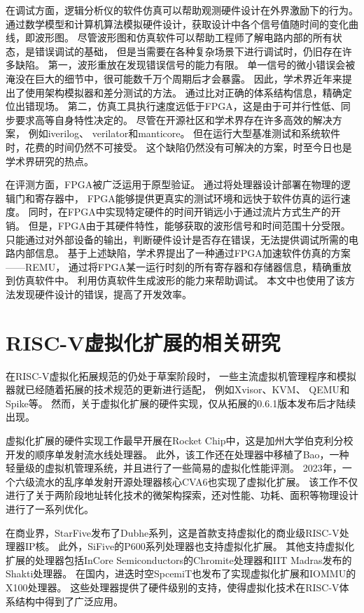 在调试方面，逻辑分析仪的软件仿真可以帮助观测硬件设计在外界激励下的行为。
通过数学模型和计算机算法模拟硬件设计，获取设计中各个信号值随时间的变化曲线，即波形图。
尽管波形图和仿真软件可以帮助工程师了解电路内部的所有状态，是错误调试的基础，
但是当需要在各种复杂场景下进行调试时，仍旧存在许多缺陷。
第一，波形重放在发现错误信号的能力有限。
单一信号的微小错误会被淹没在巨大的细节中，很可能数千万个周期后才会暴露。
因此，学术界近年来提出了使用架构模拟器和差分测试的方法。
通过比对正确的体系结构信息，精确定位出错现场。
第二，仿真工具执行速度远低于FPGA，这是由于可并行性低、同步要求高等自身特性决定的。
尽管在开源社区和学术界存在许多高效的解决方案，
例如iverilog\cite{github:iverilog}、
verilator\cite{github:verilator}和manticore\cite{asplso23manticore}。
但在运行大型基准测试和系统软件时，花费的时间仍然不可接受。
这个缺陷仍然没有可解决的方案，时至今日也是学术界研究的热点。

在评测方面，FPGA被广泛运用于原型验证。
通过将处理器设计部署在物理的逻辑门和寄存器中，
FPGA能够提供更真实的测试环境和远快于软件仿真的运行速度。
同时，在FPGA中实现特定硬件的时间开销远小于通过流片方式生产的开销。
但是，FPGA由于其硬件特性，能够获取的波形信号和时间范围十分受限。
只能通过对外部设备的输出，判断硬件设计是否存在错误，无法提供调试所需的电路内部信息。
基于上述缺陷，学术界提出了一种通过FPGA加速软件仿真的方案——REMU\cite{iccd2023remu}，
通过将FPGA某一运行时刻的所有寄存器和存储器信息，精确重放到仿真软件中。
利用仿真软件生成波形的能力来帮助调试。
本文中也使用了该方法发现硬件设计的错误，提高了开发效率。

\section{RISC-V虚拟化扩展的相关研究}
在RISC-V虚拟化拓展规范的仍处于草案阶段时，
一些主流虚拟机管理程序和模拟器就已经随着拓展的技术规范的更新进行适配，
例如Xvisor\cite{pdp2015xvisor}、KVM\cite{kvm:H-ext}、
QEMU\cite{qemu-riscv:H-ext}和Spike\cite{github:spike}等。
然而，关于虚拟化扩展的硬件实现，仅从拓展的0.6.1版本发布后才陆续出现。

虚拟化扩展的硬件实现工作最早开展在Rocket Chip\cite{itco2022rocket}中，这是加州大学伯克利分校开发的顺序单发射流水线处理器。
此外，该工作还在处理器中移植了Bao，一种轻量级的虚拟机管理系统\cite{ng-res2020bao}，并且进行了一些简易的虚拟化性能评测。
2023年，一个六级流水的乱序单发射开源处理器核心CVA6\cite{tvlsi2023cva6}也实现了虚拟化扩展。
该工作不仅进行了关于两阶段地址转化技术的微架构探索，还对性能、功耗、面积等物理设计进行了一系列优化。

在商业界，StarFive发布了Dubhe系列，这是首款支持虚拟化的商业级RISC-V处理器IP核。
此外，SiFive的P600系列处理器也支持虚拟化扩展。
其他支持虚拟化扩展的处理器包括InCore Semiconductors的Chromite处理器和IIT Madras发布的Shakti处理器。
在国内，进迭时空SpcemiT也发布了实现虚拟化扩展和IOMMU的X100处理器。
这些处理器提供了硬件级别的支持，使得虚拟化技术在RISC-V体系结构中得到了广泛应用。

